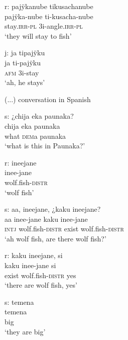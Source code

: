 \ea%
\begingl
\glpreamble \textup{r:}  pajÿkanube tikusachanube\\
\gla pajÿka-nube ti-kusacha-nube\\
\glb stay.\textsc{irr}-\textsc{pl} 3i-angle.\textsc{irr}-\textsc{pl}\\
\glft ‘they will stay to fish’
\endgl
\xe


\ea%
\begingl
\glpreamble \textup{j:} ja tipajÿku\\
\gla ja ti-pajÿku\\
\glb \textsc{afm} 3i-stay\\
\glft ‘ah, he stays’
\endgl
\xe


(...) conversation in Spanish

\ea%
\begingl
\glpreamble \textup{s:} ¿chija eka paunaka?\\
\gla chija eka paunaka\\
\glb what \textsc{dem}a paunaka\\
\glft ‘what is this in Paunaka?’
\endgl
\xe


\ea%
\begingl
\glpreamble \textup{r:} ineejane\\
\gla inee-jane\\
\glb wolf.fish-\textsc{distr}\\
\glft ‘wolf fish’
\endgl
\xe


\ea%
\begingl
\glpreamble \textup{s:} aa, ineejane, ¿kaku ineejane?\\
\gla aa inee-jane kaku inee-jane \\
\glb \textsc{intj} wolf.fish-\textsc{distr} exist wolf.fish-\textsc{distr}\\
\glft ‘ah wolf fish, are there wolf fish?’
\endgl
\xe


\ea%
\begingl
\glpreamble \textup{r:} kaku ineejane, si\\
\gla kaku inee-jane si\\
\glb exist wolf.fish-\textsc{distr} yes\\
\glft ‘there are wolf fish, yes’
\endgl
\xe


\ea%
\begingl
\glpreamble \textup{s:} temena\\
\gla temena\\
\glb big\\
\glft ‘they are big’
\endgl
\xe




